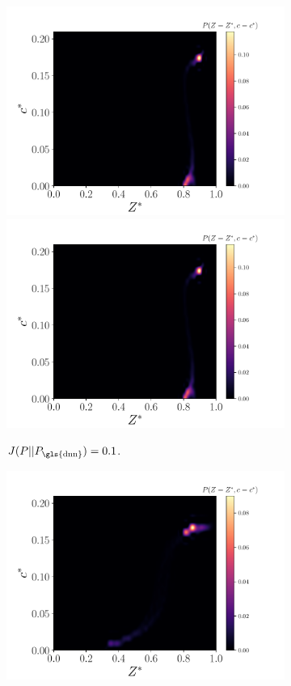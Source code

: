 \documentclass[review]{elsarticle}
\begin{document}
\begin{figure}[!tbp]
\begin{subfigure}[t]{0.32\textwidth}
    \includegraphics[page=3,width=\textwidth]{./figs/pdfs_159948.pdf}\\%
    \includegraphics[page=4,width=\textwidth]{./figs/pdfs_159948.pdf}%
    \caption{$J(P||P_{\text{\gls{dnn}}})=0.1$.}\label{fig:}%
  \end{subfigure}\hfill%
  \begin{subfigure}[t]{0.32\textwidth}%
    \includegraphics[page=3,width=\textwidth]{./figs/pdfs_182976.pdf}\\%

\end{subfigure}
\end{figure}
\end{document}

